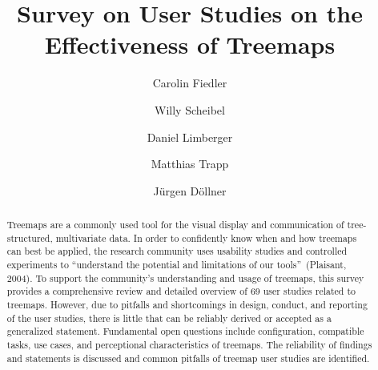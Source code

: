 \documentclass[sigconf,
natbib=true]{acmart}
\begin{document}
\title{Survey on User Studies on the Effectiveness of Treemaps}

\author{Carolin Fiedler}

\author{Willy Scheibel}

\author{Daniel Limberger}

\author{Matthias Trapp}

\author{J{\"u}rgen D{\"o}llner}

\renewcommand{\shortauthors}{C. Fiedler, W. Scheibel, D. Limberger, M. Trapp, and J. D{\"o}llner}

\begin{abstract}
    Treemaps are a commonly used tool for the visual display and communication of tree-structured, multivariate data.
 	In order to confidently know when and how treemaps can best be applied, the research community uses usability studies and controlled experiments to \enquote{understand the potential and limitations of our tools}~(Plaisant, 2004).
    To support the community's understanding and usage of treemaps, this survey provides a comprehensive review and detailed overview of 69 user studies related to treemaps.
    However, due to pitfalls and shortcomings in design, conduct, and reporting of the user studies, there is little that can be reliably derived or accepted as a generalized statement.
    Fundamental open questions include configuration, compatible tasks, use cases, and perceptional characteristics of treemaps.
    The reliability of findings and statements is discussed and common pitfalls of treemap user studies are identified.
\end{abstract}
\end{document}

